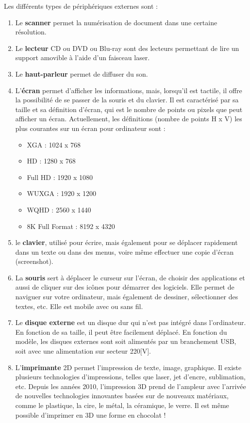\documentclass[11pt, a4paper]{book}
\begin{document}
Les différents types de périphériques externes sont :
\begin{enumerate}[1)]
    \item Le {\bf scanner} permet la numérisation de document dans une certaine résolution.
    \item Le {\bf lecteur} CD ou DVD ou Blu-ray sont des lecteurs permettant de lire un support amovible à l’aide d’un faisceau laser.
    \item Le {\bf haut-parleur} permet de diffuser du son.
    \item L’{\bf écran} permet d’afficher les informations, mais, lorsqu’il est tactile, il offre la possibilité de se passer de la souris et du clavier. Il est caractérisé par sa taille et sa définition d’écran, qui est le nombre de points ou pixels que peut afficher un écran. Actuellement, les définitions (nombre de points H x V) les plus courantes sur un écran pour ordinateur sont :
    	\begin{itemize}
            	\item XGA : 1024 x 768
            	\item  HD : 1280 x 768
            	\item  Full HD : 1920 x 1080
            	\item WUXGA : 1920 x 1200
            	\item  WQHD : 2560 x 1440
            	\item 8K Full Format : 8192 x 4320
           \end{itemize}
    \item le {\bf clavier}, utilisé pour écrire, mais également pour se déplacer rapidement dans un texte ou dans des menus, voire même effectuer une copie d’écran (screenshot).
    \item La {\bf souris} sert à déplacer le curseur sur l’écran, de choisir des applications et aussi de cliquer sur des icônes pour démarrer des logiciels. Elle permet de naviguer sur votre ordinateur, mais également de dessiner, sélectionner des textes, etc. Elle est mobile avec ou sans fil.
    \item Le {\bf disque externe} est un disque dur qui n’est pas intégré dans l’ordinateur. En fonction de sa taille, il peut être facilement déplacé. En fonction du modèle, les disques externes sont soit alimentés par un branchement USB, soit avec une alimentation sur secteur 220[V].
    \item L’{\bf imprimante} 2D permet l’impression de texte, image, graphique. Il existe plusieurs technologies d’impressions, telles que laser, jet d’encre, sublimation, etc. Depuis les années 2010, l’impression 3D prend de l’ampleur avec l’arrivée de nouvelles technologies innovantes basées sur de nouveaux matériaux, comme le plastique, la cire, le métal, la céramique, le verre. Il est même possible d’imprimer en 3D une forme en chocolat !

\end{enumerate}
\end{document}
